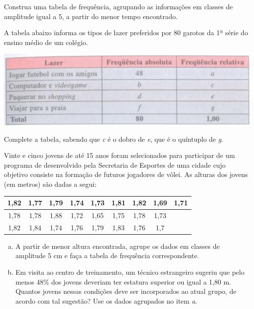 	Construa uma tabela de frequência, agrupando as informações em classes de amplitude igual a 5, a partir do menor tempo encontrado.
	
	\item A tabela abaixo informa os tipos de lazer preferidos por 80 garotos da 1ª série do ensino médio de um colégio.
	
	\begin{center}
	\includegraphics[scale=0.7]{figuras/fig106.png}
	\end{center}
	
	Complete a tabela, sabendo que \textit{c} é o dobro de \textit{e}, que é o quíntuplo de \textit{g}.
	
	\item Vinte e cinco jovens de até 15 anos foram selecionados para participar de um programa de desenvolvido pela Secretaria de Esportes de uma cidade cujo objetivo consiste na formação de futuros jogadores de vôlei. As alturas dos jovens (em metros) são dadas a segui:
	
	\begin{center}
	\begin{tabular}{ccccccccc}
	\hline 
	1,82 & 1,77 & 1,79 & 1,74 & 1,73 & 1,81 & 1,82 & 1,69 & 1,71 \\ 
	\hline 
	1,78 & 1,78 & 1,88 & 1,72 & 1,65 & 1,75 & 1,78 & 1,73 &   \\ 
	\hline 
	1,82 & 1,84 & 1,74 & 1,76 & 1,79 & 1,83 & 1,76 & 1,7 &   \\ 
	\hline 
	\end{tabular} 
	\end{center}
	
	\begin{enumerate}[a)]
		\item A partir de menor altura encontrada, agrupe os dados em classes de amplitude 5 cm e faça a tabela de frequência correspondente.
		\item Em visita ao centro de treinamento, um técnico estrangeiro sugeriu que pelo menos 48\% dos jovens deveriam ter estatura superior ou igual a 1,80 m. Quantos jovens nessas condições deve ser incorporados ao atual grupo, de acordo com tal sugestão? Use os dados agrupados no item \textit{a}.
	\end{enumerate}
	
